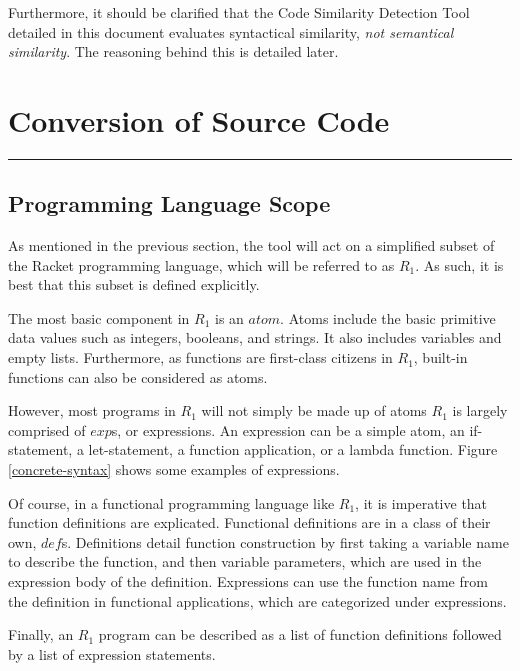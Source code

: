 \documentclass[12pt]{article}
\newcommand{\R}{\ensuremath{\mathit{R_{1}}}}
\newcommand{\itm}[1]{\ensuremath{\mathit{#1}}}
\newcommand{\Atm}[0]{\itm{atom}}
\newcommand{\Exp}[0]{\itm{exp}}
\newcommand{\Def}[0]{\itm{def}}
\newcommand{\usection}[1]{\section{#1}\hrule\hfill}
\begin{document}
\hfill

Furthermore, it should be clarified that the Code Similarity Detection Tool detailed in this document evaluates syntactical similarity, \emph{not semantical similarity}. The reasoning behind this is detailed later.

\newpage 

\usection{Conversion of Source Code}

\subsection{Programming Language Scope}

As mentioned in the previous section, the tool will act on a simplified subset of the Racket programming language, which will be referred to as \R{}. As such, it is best that this subset is defined explicitly.

\hfill

The most basic component in \R{} is an \Atm{}. Atoms include the basic primitive data values such as integers, booleans, and strings. It also includes variables and empty lists. Furthermore, as functions are first-class citizens in \R{}, built-in functions can also be considered as atoms.

\hfill

However, most programs in \R{} will not simply be made up of atoms \textemdash \R{} is largely comprised of \Exp{}s, or expressions. An expression can be a simple atom, an if-statement, a let-statement, a function application, or a lambda function. Figure \ref{concrete-syntax} shows some examples of expressions.

\hfill

Of course, in a functional programming language like \R{}, it is imperative that function definitions are explicated. Functional definitions are in a class of their own, \Def{}s. Definitions detail function construction by first taking a variable name to describe the function, and then variable parameters, which are used in the expression body of the definition. Expressions can use the function name from the definition in functional applications, which are categorized under expressions.

\hfill

Finally, an \R{} program can be described as a list of function definitions followed by a list of expression statements.
\end{document}
